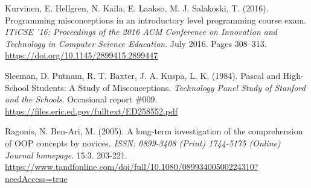 \documentclass[twocolumn]{article}
\begin{document}
\begin{thebibliography}{9}
Kurvinen, E. Hellgren, N. Kaila, E. Laakso, M. J. Salakoski, T. (2016). Programming misconceptions in an introductory level programming course exam. \emph{ITiCSE '16: Proceedings of the 2016 ACM Conference on Innovation and Technology in Computer Science Education}. July 2016. Pages 308–313. 
\url{https://doi.org/10.1145/2899415.2899447}

Sleeman, D. Putnam, R. T. Baxter, J. A. Kuspa, L. K. (1984). Pascal and High-School Students: A Study of Misconceptions. \emph{Technology Panel Study of Stanford and the Schools}. Occasional report \#009. 
\url{https://files.eric.ed.gov/fulltext/ED258552.pdf}

Ragonis, N. Ben-Ari, M. (2005). A long-term investigation of the comprehension of OOP concepts by novices. \emph{ISSN: 0899-3408 (Print) 1744-5175 (Online) Journal homepage}. 15:3. 203-221. 
\url{https://www.tandfonline.com/doi/full/10.1080/08993400500224310?needAccess=true}




\end{thebibliography}
\end{document}
